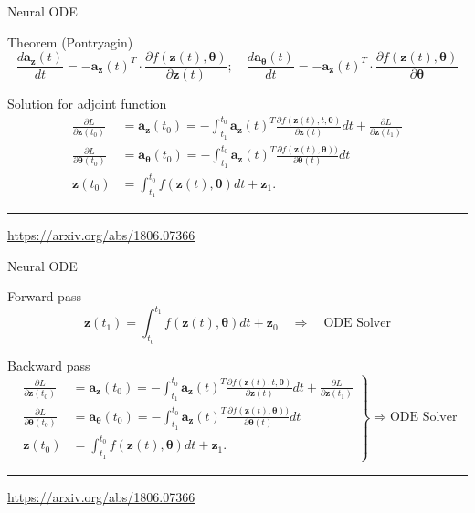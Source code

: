\documentclass{beamer}
\newcommand{\ba}{\mathbf{a}}
\newcommand{\bz}{\mathbf{z}}
\newcommand{\btheta}{\boldsymbol{\theta}}
\begin{document}
\begin{frame}{Neural ODE}
	\begin{block}{Theorem (Pontryagin)}
		\vspace{-0.3cm}
		\[
		\frac{d \ba_{\bz}(t)}{dt} = - \ba_{\bz}(t)^T \cdot \frac{\partial f(\bz(t), \btheta)}{\partial \bz(t)}; \quad  \frac{d \ba_{\btheta}(t)}{dt} = - \ba_{\bz}(t)^T \cdot \frac{\partial f(\bz(t), \btheta)}{\partial \btheta}
		\]
	\end{block}
	\begin{block}{Solution for adjoint function}
		\begin{align*}
		 \frac{\partial L}{\partial \bz(t_0)} &= \ba_{\bz}(t_0) =  - \int_{t_1}^{t_0} \ba_{\bz}(t)^T \frac{\partial f(\bz(t), t, \btheta)}{\partial \bz(t)} dt + \frac{\partial L}{\partial \bz(t_1)} \\
		 \frac{\partial L}{\partial \btheta(t_0)} &= \ba_{\btheta}(t_0) =  - \int_{t_1}^{t_0} \ba_{\bz}(t)^T \frac{\partial f(\bz(t), \btheta))}{\partial \btheta(t)} dt \\
		 \bz(t_0) &= \int^{t_0}_{t_1} f(\bz(t), \btheta) d t  + \bz_1.
		\end{align*}
	\end{block}
	\vfill
	\hrule\medskip
	{\scriptsize \href{https://arxiv.org/abs/1806.07366}{https://arxiv.org/abs/1806.07366}} 
\end{frame}
\begin{frame}{Neural ODE}
	\begin{block}{Forward pass}
		\[
		\bz(t_1) = \int^{t_1}_{t_0} f(\bz(t), \btheta) d t  + \bz_0 \quad \Rightarrow \quad \text{ODE Solver}
		\]
	\end{block}
	\begin{block}{Backward pass}
		\small
		\vspace{-0.3cm}
		\begin{equation*}
			{\left.\begin{aligned}
				\frac{\partial L}{\partial \bz(t_0)} &= \ba_{\bz}(t_0) =  - \int_{t_1}^{t_0} \ba_{\bz}(t)^T \frac{\partial f(\bz(t), t, \btheta)}{\partial \bz(t)} dt + \frac{\partial L}{\partial \bz(t_1)} \\
				\frac{\partial L}{\partial \btheta(t_0)} &= \ba_{\btheta}(t_0) =  - \int_{t_1}^{t_0} \ba_{\bz}(t)^T \frac{\partial f(\bz(t), \btheta))}{\partial \btheta(t)} dt \\
				\bz(t_0) &= \int^{t_0}_{t_1} f(\bz(t), \btheta) d t  + \bz_1.
			\end{aligned}\right\rbrace} \Rightarrow
			\text{ODE Solver}
		\end{equation*}
	\end{block}
	\vfill
	\hrule\medskip
	{\scriptsize \href{https://arxiv.org/abs/1806.07366}{https://arxiv.org/abs/1806.07366}} 
\end{frame}
\end{document}
